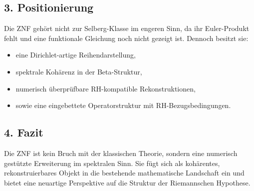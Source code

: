 \subsection*{3. Positionierung}

Die ZNF gehört nicht zur Selberg-Klasse im engeren Sinn, da ihr Euler-Produkt fehlt und eine funktionale Gleichung noch nicht gezeigt ist. Dennoch besitzt sie:

\begin{itemize}
    \item eine Dirichlet-artige Reihendarstellung,
    \item spektrale Kohärenz in der Beta-Struktur,
    \item numerisch überprüfbare RH-kompatible Rekonstruktionen,
    \item sowie eine eingebettete Operatorstruktur mit RH-Bezugsbedingungen.
\end{itemize}

\subsection*{4. Fazit}

Die ZNF ist kein Bruch mit der klassischen Theorie, sondern eine numerisch gestützte Erweiterung im spektralen Sinn. Sie fügt sich als kohärentes, rekonstruierbares Objekt in die bestehende mathematische Landschaft ein und bietet eine neuartige Perspektive auf die Struktur der Riemannschen Hypothese.